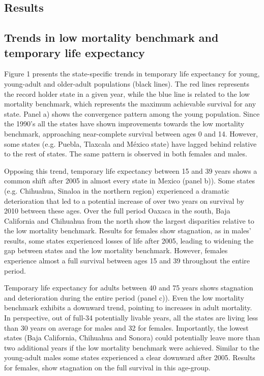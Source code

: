 \documentclass[11.5pt]{article}
\begin{document}
\begin{spacing}{1.5}
\section*{Results}
\subsection*{Trends in low mortality benchmark and temporary life expectancy}
Figure 1 presents the state-specific trends in temporary life expectancy for young, young-adult and older-adult populations (black lines). The red lines represents the record holder state in a given year, while the blue line is related to the low mortality benchmark, which represents the maximum achievable survival for any state. Panel a) shows the convergence pattern among the young population. Since the 1990's all the states have shown improvements towards the low mortality benchmark, approaching near-complete survival between ages 0 and 14. However, some states (e.g. Puebla, Tlaxcala and M\'exico state) have lagged behind relative to the rest of states. The same pattern is observed in both females and males. 

Opposing this trend, temporary life expectancy between 15 and 39 years shows a common shift after 2005 in almost every state in Mexico  (panel b)). Some states (e.g. Chihuahua, Sinaloa in the northern region) experienced a dramatic deterioration that led to a potential increase of over two years on survival by 2010 between these ages.  Over the full period Oaxaca in the south, Baja California and Chihuahua from the north show the largest disparities relative to the low mortality benchmark. Results for females show stagnation, as in males' results, some states experienced losses of life after 2005, leading to widening the gap between states and the low mortality benchmark. However, females experience almost a full survival between ages 15 and 39 throughout the entire period. 


Temporary life expectancy for adults between 40 and 75 years shows stagnation and deterioration during the entire period (panel c)). Even the low mortality benchmark exhibits a downward trend, pointing to increases in adult mortality. In perspective, out of full-34 potentially livable years, all the states are living less than 30 years on average for males and 32 for females. Importantly, the lowest states (Baja California, Chihuahua and Sonora) could potentially leave more than two additional years if the low mortality benchmark were achieved. Similar to the young-adult males some states experienced a  clear downward after 2005. Results for females, show stagnation on the full survival in this age-group. 


\end{spacing}
\end{document}
